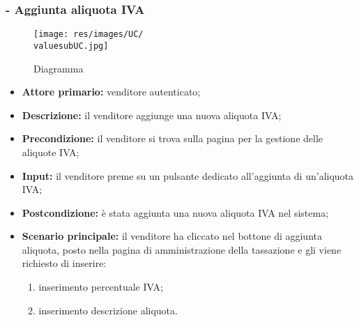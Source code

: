 \subsubsection{- Aggiunta aliquota IVA}
\begin{figure}[H]
    \centering
    \texttt{[image: res/images/UC/\\valuesubUC.jpg]}
    \caption{Diagramma }
\end{figure}
\begin{itemize}
    \item \textbf{Attore primario:} venditore autenticato;
    \item \textbf{Descrizione:} il venditore aggiunge una nuova aliquota IVA;
    \item \textbf{Precondizione:} il venditore si trova sulla pagina per la gestione delle aliquote IVA;
    \item \textbf{Input:} il venditore preme su un pulsante dedicato all'aggiunta di un'aliquota IVA;
    \item \textbf{Postcondizione:} è stata aggiunta una nuova aliquota IVA nel sistema;
    \item \textbf{Scenario principale:} il venditore ha cliccato nel bottone di aggiunta aliquota, posto nella pagina di amministrazione della tassazione e gli viene richiesto di inserire:
          \begin{enumerate}
              \item inserimento percentuale IVA;
              \item inserimento descrizione aliquota.
          \end{enumerate}
\end{itemize}

\stepsubUserCase
